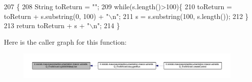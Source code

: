 \begin{DoxyCode}
207                                               \{
208         String toReturn = \textcolor{stringliteral}{""};
209         \textcolor{keywordflow}{while}(s.length()>100)\{
210             toReturn = toReturn + s.substring(0, 100) + \textcolor{stringliteral}{"\(\backslash\)n"};
211             s = s.substring(100, s.length());
212         \}
213         \textcolor{keywordflow}{return} toReturn + s + \textcolor{stringliteral}{"\(\backslash\)n"};
214     \}
\end{DoxyCode}


Here is the caller graph for this function\-:\nopagebreak
\begin{figure}[H]
\begin{center}
\leavevmode
\includegraphics[width=350pt]{classit_1_1isislab_1_1masonassisteddocumentation_1_1mason_1_1wizards_1_1_q___end_wizard_a89adac239da36e67abac1ec9c416bba4_icgraph}
\end{center}
\end{figure}




